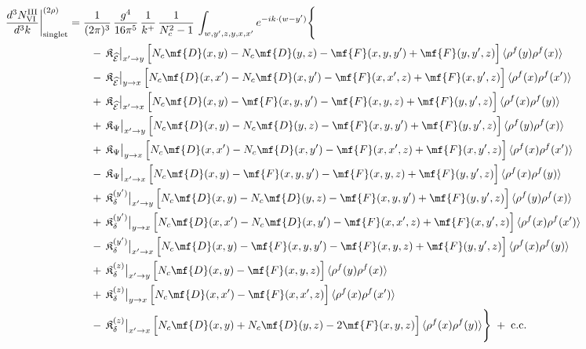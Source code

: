 {\begin{align}
\frac{d^{3}N^{\rm III}_{\rm VI}}{d^{3}k}\bigg|^{(2\rho)}_{\rm singlet}&=\frac{1}{(2\pi)^{3}}\,\frac{g^{4}}{16\pi^{5}}\,\frac{1}{k^{+}}\,\frac{1}{N_{c}^{2}-1}\,\int_{w,y',z,y,x,x'}e^{-ik\cdot(w-y')}\Bigg\{\notag\\
&\qquad -\,\mathfrak{K}_{\widehat{\mathcal{E}}}\big|_{x'\to y}\,\Big[N_{c}\mf{D}(x,y)-N_{c}\mf{D}(y,z)-\mf{F}(x,y,y')+\mf{F}(y,y',z)\Big]\,\langle\rho^{f}(y)\rho^{f}(x)\rangle\notag\\
&\qquad -\,\mathfrak{K}_{\widehat{\mathcal{E}}}\big|_{y\to x}\,\Big[N_{c}\mf{D}(x,x')-N_{c}\mf{D}(x,y')-\mf{F}(x,x',z)+\mf{F}(x,y',z)\Big]\,\langle\rho^{f}(x)\rho^{f}(x')\rangle\notag\\
&\qquad +\,\mathfrak{K}_{\widehat{\mathcal{E}}}\big|_{x'\to x}\,\Big[N_{c}\mf{D}(x,y)-\mf{F}(x,y,y')-\mf{F}(x,y,z)+\mf{F}(y,y',z)\Big]\,\langle\rho^{f}(x)\rho^{f}(y)\rangle\notag\\
&\qquad +\,\mathfrak{K}_{\Psi}\big|_{x'\to y}\,\Big[N_{c}\mf{D}(x,y)-N_{c}\mf{D}(y,z)-\mf{F}(x,y,y')+\mf{F}(y,y',z)\Big]\,\langle\rho^{f}(y)\rho^{f}(x)\rangle\notag\\
&\qquad +\,\mathfrak{K}_{\Psi}\big|_{y\to x}\,\Big[N_{c}\mf{D}(x,x')-N_{c}\mf{D}(x,y')-\mf{F}(x,x',z)+\mf{F}(x,y',z)\Big]\,\langle\rho^{f}(x)\rho^{f}(x')\rangle\notag\\
&\qquad -\,\mathfrak{K}_{\Psi}\big|_{x'\to x}\,\Big[N_{c}\mf{D}(x,y)-\mf{F}(x,y,y')-\mf{F}(x,y,z)+\mf{F}(y,y',z)\Big]\,\langle\rho^{f}(x)\rho^{f}(y)\rangle\notag\\
&\qquad +\,\mathfrak{K}_{\delta}^{(y')}\big|_{x'\to y}\,\Big[N_{c}\mf{D}(x,y)-N_{c}\mf{D}(y,z)-\mf{F}(x,y,y')+\mf{F}(y,y',z)\Big]\,\langle\rho^{f}(y)\rho^{f}(x)\rangle\notag\\
&\qquad +\,\mathfrak{K}_{\delta}^{(y')}\big|_{y\to x}\,\Big[N_{c}\mf{D}(x,x')-N_{c}\mf{D}(x,y')-\mf{F}(x,x',z)+\mf{F}(x,y',z)\Big]\,\langle\rho^{f}(x)\rho^{f}(x')\rangle\notag\\
&\qquad -\,\mathfrak{K}_{\delta}^{(y')}\big|_{x'\to x}\,\Big[N_{c}\mf{D}(x,y)-\mf{F}(x,y,y')-\mf{F}(x,y,z)+\mf{F}(y,y',z)\Big]\,\langle\rho^{f}(x)\rho^{f}(y)\rangle\notag\\
&\qquad +\,\mathfrak{K}_{\delta}^{(z)}\big|_{x'\to y}\,\Big[N_{c}\mf{D}(x,y)-\mf{F}(x,y,z)\Big]\,\langle\rho^{f}(y)\rho^{f}(x)\rangle\notag\\
&\qquad +\,\mathfrak{K}_{\delta}^{(z)}\big|_{y\to x}\,\Big[N_{c}\mf{D}(x,x')-\mf{F}(x,x',z)\Big]\,\langle\rho^{f}(x)\rho^{f}(x')\rangle\notag\\
&\qquad -\,\mathfrak{K}_{\delta}^{(z)}\big|_{x'\to x}\,\Big[N_{c}\mf{D}(x,y)+N_{c}\mf{D}(y,z)-2\mf{F}(x,y,z)\Big]\,\langle\rho^{f}(x)\rho^{f}(y)\rangle\Bigg\}\;+\;{\rm c.c.}\label{eq:s-III-VI}
\end{align}

}
